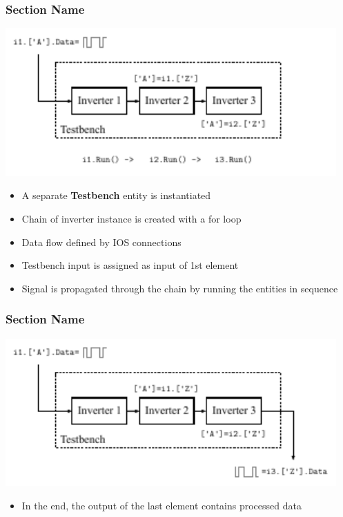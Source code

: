 \documentclass{sdkslides}
\newcommand{\sectname}{Section Name}
\begin{document}
\begin{frame}[t]
    \frametitle{\sectname}
    \centering
    \includegraphics[width=0.95\textwidth]{Pics/inverter_chain_4}
    \begin{itemize}
        \item A separate \textbf{Testbench} entity is instantiated
        \item Chain of inverter instance is created with a for loop
        \item Data flow defined by IOS connections
        \item Testbench input is assigned as input of 1st element
        \item Signal is propagated through the chain by running the entities
            in sequence
    \end{itemize}
\end{frame}

\begin{frame}[t]
    \frametitle{\sectname}
    \centering
    \includegraphics[width=0.95\textwidth]{Pics/inverter_chain_5}
    \begin{itemize}
        \item In the end, the output of the last element contains processed data
    \end{itemize}
\end{frame}
\end{document}
